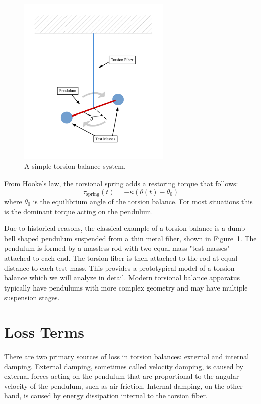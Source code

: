\documentclass{book}
\begin{document}
\begin{figure}[!h]
\begin{centering}
\includegraphics[width=0.65\textwidth]{SimpleTorsionBalance.pdf}
\caption{A simple torsion balance system.}\label{simpleFig}
\end{centering}
\end{figure}

From Hooke's law, the torsional spring adds a restoring torque that follows:
\begin{equation}
\tau_{\text{spring}}(t) = -\kappa (\theta(t)-\theta_0)
\end{equation}
where $\theta_0$ is the equilibrium angle of the torsion balance. For most situations this is the dominant torque acting on the pendulum.

Due to historical reasons, the classical example of a torsion balance is a dumb-bell shaped pendulum suspended from a thin metal fiber, shown in Figure~\ref{simpleFig}. The pendulum is formed by a massless rod with two equal mass "test masses" attached to each end. The torsion fiber is then attached to the rod at equal distance to each test mass. This provides a prototypical model of a torsion balance which we will analyze in detail. Modern torsional balance apparatus typically have pendulums with more complex geometry and may have multiple suspension stages. 

\section{Loss Terms}

\quad There are two primary sources of loss in torsion balances: external and internal damping. External damping, sometimes called velocity damping, is caused by external forces acting on the pendulum that are proportional to the angular velocity of the pendulum, such as air friction. Internal damping, on the other hand, is caused by energy dissipation internal to the torsion fiber.
\end{document}
